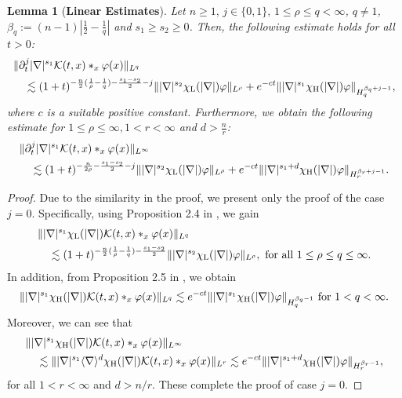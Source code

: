 \documentclass[11pt,reqno]{amsart}
\newtheorem{lemma}{Lemma}[section]
\begin{document}
\begin{lemma}[\textbf{Linear Estimates}]\label{LinearEstimates}
    Let $n \geq 1,\, j \in \{ 0,1\}, \,
    1 \leq \rho \leq q < \infty$, $q \ne 1$, $\beta_q := (n-1)\left|\frac{1}{2}-\frac{1}{q}\right|$ and $s_1 \geq s_2 \geq 0$.  Then, the following estimate holds for all $t > 0$:
    \begin{align*}
        &\|\partial_t^j |\nabla|^{s_1} \mathcal{K}(t,x)\ast_x \varphi(x)\|_{L^q}\\ &\quad\lesssim (1+t)^{-\frac{n}{2}(\frac{1}{\rho}-\frac{1}{q})-\frac{s_1-s_2}{2}-j} \||\nabla|^{s_2} \chi_{\rm L}(|\nabla|)\varphi\|_{L^{\rho}} + e^{-ct} \||\nabla|^{s_1}\chi_{\rm H}(|\nabla|) \varphi\|_{H_{q}^{\beta_q+j-1}},
        \end{align*}
        where $c$ is a suitable positive constant.
    Furthermore, we obtain the following estimate for $ 1\leq \rho \leq \infty, 1 < r < \infty$ and $d > \displaystyle\frac{n}{r}$:
    \begin{align*}
        &\|\partial_t^j |\nabla|^{s_1}\mathcal{K}(t,x) \ast_x \varphi(x) \|_{L^{\infty}}\\ &\quad\lesssim (1+t)^{-\frac{n}{2\rho}-\frac{s_1-s_2}{2}-j} \||\nabla|^{s_2} \chi_{\rm L}(|\nabla|) \varphi\|_{L^\rho} + e^{-ct} \||\nabla|^{s_1 + d} \chi_{\rm H}(|\nabla|) \varphi\|_{H^{\beta_r+j -1}_r}.
    \end{align*}
\end{lemma}

\begin{proof}
   Due to the similarity in the proof, we present only the proof of the case $j=0$. Specifically, using Proposition 2.4 in \cite{Ikeda2019}, we gain
\begin{align*}
    &\||\nabla|^{s_1} \chi_{\rm L}(|\nabla|) \mathcal{K}(t,x) \ast_x \varphi(x)\|_{L^q} \\
    &\quad\lesssim (1+t)^{-\frac{n}{2}(\frac{1}{\rho}-\frac{1}{q})-\frac{s_1-s_2}{2}} \||\nabla|^{s_2} \chi_{\rm L}(|\nabla|) \varphi\|_{L^\rho}, \text{ for all } 1 \leq \rho \leq q \leq \infty.
\end{align*}
    In addition, from Proposition 2.5 in \cite{Ikeda2019}, we obtain 
    \begin{align*}
         \| |\nabla|^{s_1} \chi_{\rm H}(|\nabla|) \mathcal{K}(t,x)\ast_x \varphi(x)\|_{L^q} \lesssim e^{-ct} \||\nabla|^{s_1} \chi_{\rm H}(|\nabla|) \varphi\|_{H^{\beta_q-1}_q} \text{ for } 1 < q < \infty.
    \end{align*}
    Moreover, we can see that
    \begin{align}
        &\||\nabla|^{s_1} \chi_{\rm H}(|\nabla|) \mathcal{K}(t,x) \ast_x \varphi(x)\|_{L^{\infty}} \notag\\
        &\quad\lesssim \||\nabla|^{s_1} \langle \nabla \rangle^{d} \chi_{\rm H}(|\nabla|) \mathcal{K}(t,x) \ast_x\varphi(x)\|_{L^r} \lesssim e^{-ct} \||\nabla|^{s_1+d} \chi_{\rm H}(|\nabla|) \varphi\|_{H^{\beta_r-1}_r}, \label{Esti100}
    \end{align}
    for all $1< r < \infty$ and $d > n/r$.
    These complete the proof of case $j=0$.
\end{proof}
\end{document}
